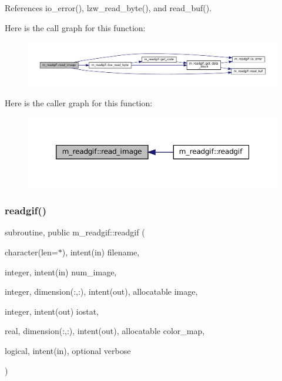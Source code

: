 References io\+\_\+error(), lzw\+\_\+read\+\_\+byte(), and read\+\_\+buf().

Here is the call graph for this function\+:\nopagebreak
\begin{figure}[H]
\begin{center}
\leavevmode
\includegraphics[width=350pt]{namespacem__readgif_a4af978d944dbefb3ddeb81cd8c54d0f9_cgraph}
\end{center}
\end{figure}
Here is the caller graph for this function\+:\nopagebreak
\begin{figure}[H]
\begin{center}
\leavevmode
\includegraphics[width=350pt]{namespacem__readgif_a4af978d944dbefb3ddeb81cd8c54d0f9_icgraph}
\end{center}
\end{figure}
\mbox{\label{namespacem__readgif_a775e2da2a9f54ec308e87a339a393ed6}} 
\subsubsection{\texorpdfstring{readgif()}{readgif()}}
{\footnotesize\ttfamily subroutine, public m\+\_\+readgif\+::readgif (\begin{DoxyParamCaption}\item[{character(len=$\ast$), intent(in)}]{filename,  }\item[{integer, intent(in)}]{num\+\_\+image,  }\item[{integer, dimension(\+:,\+:), intent(out), allocatable}]{image,  }\item[{integer, intent(out)}]{iostat,  }\item[{real, dimension(\+:,\+:), intent(out), allocatable}]{color\+\_\+map,  }\item[{logical, intent(in), optional}]{verbose }\end{DoxyParamCaption})}




